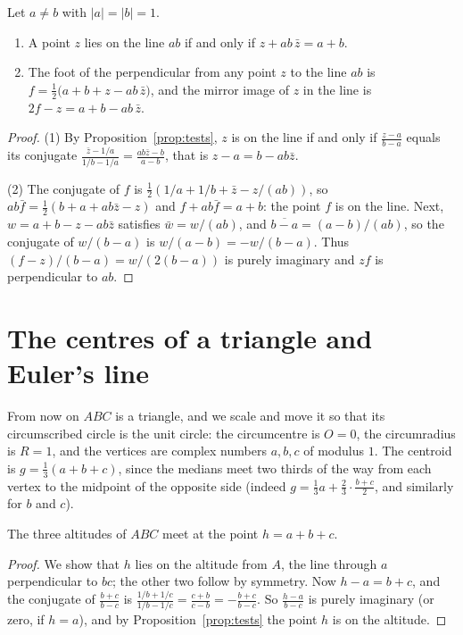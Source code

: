 \begin{lemma}\label{lem:chord}
Let $a\ne b$ with $|a|=|b|=1$.
\begin{enumerate}
\item A point $z$ lies on the line $ab$ if and only if $z+ab\,\bar z=a+b$.
\item The foot of the perpendicular from any point $z$ to the line $ab$ is $f=\frac12\bigl(a+b+z-ab\,\bar z\bigr)$, and the mirror
image of $z$ in the line is $2f-z=a+b-ab\,\bar z$.
\end{enumerate}
\end{lemma}
\begin{proof}
(1) By Proposition~\ref{prop:tests}, $z$ is on the line if and only if $\frac{z-a}{b-a}$ equals its conjugate
$\frac{\bar z-1/a}{1/b-1/a}=\frac{ab\bar z-b}{a-b}$, that is $z-a=b-ab\bar z$.

(2) The conjugate of $f$ is $\frac12(1/a+1/b+\bar z-z/(ab))$, so $ab\bar f=\frac12(b+a+ab\bar z-z)$ and $f+ab\bar f=a+b$: the point $f$
is on the line. Next, $w=a+b-z-ab\bar z$ satisfies $\bar w=w/(ab)$, and $\overline{b-a}=(a-b)/(ab)$, so the conjugate of
$w/(b-a)$ is $w/(a-b)=-w/(b-a)$. Thus $(f-z)/(b-a)=w/(2(b-a))$ is purely imaginary and $zf$ is perpendicular to $ab$.
\end{proof}

\section{The centres of a triangle and Euler's line}

From now on $ABC$ is a triangle, and we scale and move it so that its circumscribed circle is the unit circle: the circumcentre is
$O=0$, the circumradius is $R=1$, and the vertices are complex numbers $a,b,c$ of modulus $1$. The centroid is
$g=\frac13(a+b+c)$, since the medians meet two thirds of the way from each vertex to the midpoint of the opposite side (indeed
$g=\frac13a+\frac23\cdot\frac{b+c}2$, and similarly for $b$ and $c$).

\begin{proposition}\label{prop:orthocentre}
The three altitudes of $ABC$ meet at the point $h=a+b+c$.
\end{proposition}
\begin{proof}
We show that $h$ lies on the altitude from $A$, the line through $a$ perpendicular to $bc$; the other two follow by symmetry. Now
$h-a=b+c$, and the conjugate of $\frac{b+c}{b-c}$ is $\frac{1/b+1/c}{1/b-1/c}=\frac{c+b}{c-b}=-\frac{b+c}{b-c}$. So $\frac{h-a}{b-c}$
is purely imaginary (or zero, if $h=a$), and by Proposition~\ref{prop:tests} the point $h$ is on the altitude.
\end{proof}

